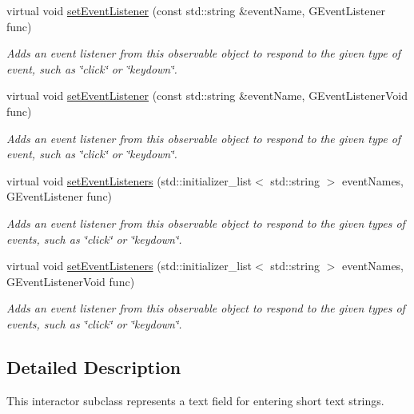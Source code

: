 \begin{DoxyCompactItemize}
virtual void \mbox{\hyperlink{classGObservable_ad2f6d34961c50f6c1e0659990b79f741}{set\+Event\+Listener}} (const std\+::string \&event\+Name, G\+Event\+Listener func)
\begin{DoxyCompactList}\small\item\em Adds an event listener from this observable object to respond to the given type of event, such as \char`\"{}click\char`\"{} or \char`\"{}keydown\char`\"{}. \end{DoxyCompactList}\item 
virtual void \mbox{\hyperlink{classGObservable_abac4cb9f9e626e010e87f5d91573c8a5}{set\+Event\+Listener}} (const std\+::string \&event\+Name, G\+Event\+Listener\+Void func)
\begin{DoxyCompactList}\small\item\em Adds an event listener from this observable object to respond to the given type of event, such as \char`\"{}click\char`\"{} or \char`\"{}keydown\char`\"{}. \end{DoxyCompactList}\item 
virtual void \mbox{\hyperlink{classGObservable_afa388d69c33c718cf035774604065604}{set\+Event\+Listeners}} (std\+::initializer\+\_\+list$<$ std\+::string $>$ event\+Names, G\+Event\+Listener func)
\begin{DoxyCompactList}\small\item\em Adds an event listener from this observable object to respond to the given types of events, such as \char`\"{}click\char`\"{} or \char`\"{}keydown\char`\"{}. \end{DoxyCompactList}\item 
virtual void \mbox{\hyperlink{classGObservable_a7867184bbb686f74fae8a4db927da799}{set\+Event\+Listeners}} (std\+::initializer\+\_\+list$<$ std\+::string $>$ event\+Names, G\+Event\+Listener\+Void func)
\begin{DoxyCompactList}\small\item\em Adds an event listener from this observable object to respond to the given types of events, such as \char`\"{}click\char`\"{} or \char`\"{}keydown\char`\"{}. \end{DoxyCompactList}\end{DoxyCompactItemize}


\subsection{Detailed Description}
This interactor subclass represents a text field for entering short text strings. 

